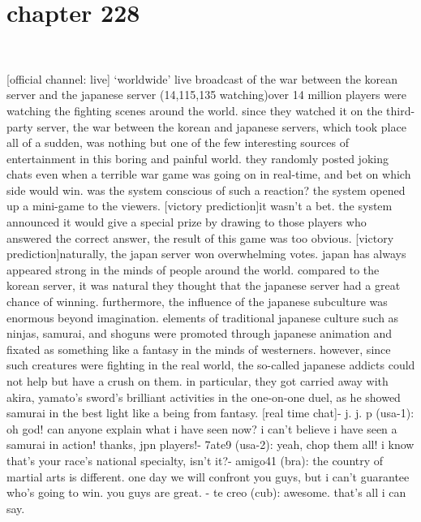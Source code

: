\section{chapter 228}

                             




[official channel: live] ‘worldwide’ live broadcast of the war between the korean server and the japanese server (14,115,135 watching)over 14 million players were watching the fighting scenes around the world.
since they watched it on the third-party server, the war between the korean and japanese servers, which took place all of a sudden, was nothing but one of the few interesting sources of entertainment in this boring and painful world.
they randomly posted joking chats even when a terrible war game was going on in real-time, and bet on which side would win.
was the system conscious of such a reaction? the system opened up a mini-game to the viewers.
[victory prediction]it wasn’t a bet.
 the system announced it would give a special prize by drawing to those players who answered the correct answer, the result of this game was too obvious.
[victory prediction]naturally, the japan server won overwhelming votes.
 japan has always appeared strong in the minds of people around the world.
 compared to the korean server, it was natural they thought that the japanese server had a great chance of winning.
furthermore, the influence of the japanese subculture was enormous beyond imagination.
elements of traditional japanese culture such as ninjas, samurai, and shoguns were promoted through japanese animation and fixated as something like a fantasy in the minds of westerners.
however, since such creatures were fighting in the real world, the so-called japanese addicts could not help but have a crush on them.
in particular, they got carried away with akira, yamato’s sword’s brilliant activities in the one-on-one duel, as he showed samurai in the best light like a being from fantasy.
[real time chat]- j.
j.
p (usa-1): oh god! can anyone explain what i have seen now? i can’t believe i have seen a samurai in action! thanks, jpn players!- 7ate9 (usa-2): yeah, chop them all! i know that’s your race’s national specialty, isn’t it?- amigo41 (bra): the country of martial arts is different.
 one day we will confront you guys, but i can’t guarantee who’s going to win.
 you guys are great.
- te creo (cub): awesome.
 that’s all i can say.

